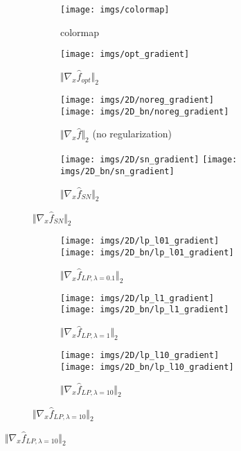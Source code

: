 \documentclass{article}
\begin{document}
\begin{figure}[h]

\begin{subfigure}{\linewidth}
\begin{subfigure}{.16\linewidth}
  \centering
  \texttt{[image: imgs/colormap]}
  \caption{colormap}
\end{subfigure}
\begin{subfigure}{.16\linewidth}
  \centering
  \texttt{[image: imgs/opt\_gradient]}
  \caption{$\Vert\nabla_x \hat{f}_{opt} \Vert_2$}
\end{subfigure}
\begin{subfigure}{.33\linewidth}
  \texttt{[image: imgs/2D/noreg\_gradient]}\hfill
  \texttt{[image: imgs/2D\_bn/noreg\_gradient]}
  \caption{$\Vert\nabla_x \hat{f} \Vert_2$ (no regularization)}
\end{subfigure}
\begin{subfigure}{.33\linewidth}
  \texttt{[image: imgs/2D/sn\_gradient]}\hfill
  \texttt{[image: imgs/2D\_bn/sn\_gradient]}
  \caption{$\Vert\nabla_x \hat{f}_{SN} \Vert_2$}
\end{subfigure}
\end{subfigure}\par

\begin{subfigure}{\linewidth}
\begin{subfigure}{.33\linewidth}
  \texttt{[image: imgs/2D/lp\_l01\_gradient]}\hfill
  \texttt{[image: imgs/2D\_bn/lp\_l01\_gradient]}
  \caption{$\Vert\nabla_x \hat{f}_{LP, \lambda=0.1} \Vert_2$}
\end{subfigure}
\begin{subfigure}{.33\linewidth}
  \texttt{[image: imgs/2D/lp\_l1\_gradient]}\hfill
  \texttt{[image: imgs/2D\_bn/lp\_l1\_gradient]}
  \caption{$\Vert\nabla_x \hat{f}_{LP, \lambda=1} \Vert_2$}
\end{subfigure}
\begin{subfigure}{.33\linewidth}
  \texttt{[image: imgs/2D/lp\_l10\_gradient]}\hfill
  \texttt{[image: imgs/2D\_bn/lp\_l10\_gradient]}
  \caption{$\Vert\nabla_x \hat{f}_{LP, \lambda=10} \Vert_2$}
\end{subfigure}
\end{subfigure}\par


\end{figure}
\end{document}
